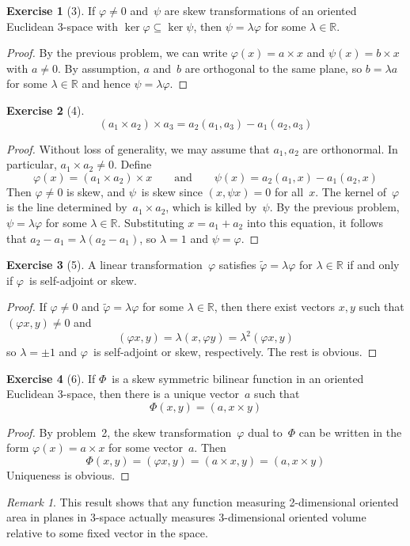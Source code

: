 \documentclass[letterpaper,12pt]{article}
\newcommand{\R}{\mathbb{R}}
\newcommand{\cross}{\times}
\newcommand{\iprod}[2]{(#1,#2)}
\newcommand{\adj}[1]{\widetilde{#1}}
\theoremstyle{definition}
\newtheorem*{exer}{Exercise}
\theoremstyle{remark}
\newtheorem*{rmk}{Remark}
\begin{document}
\begin{exer}[3]
If \(\varphi\ne 0\) and~\(\psi\) are skew transformations of an oriented Euclidean 3-space with \(\ker\varphi\subseteq\ker\psi\), then \(\psi=\lambda\varphi\) for some \(\lambda\in\R\).
\end{exer}
\begin{proof}
By the previous problem, we can write \(\varphi(x)=a\cross x\) and \(\psi(x)=b\cross x\) with \(a\ne 0\). By assumption, \(a\) and~\(b\) are orthogonal to the same plane, so \(b=\lambda a\) for some \(\lambda\in\R\) and hence \(\psi=\lambda\varphi\).
\end{proof}

\begin{exer}[4]
\[(a_1\cross a_2)\cross a_3=a_2(a_1,a_3)-a_1(a_2,a_3)\]
\end{exer}
\begin{proof}
Without loss of generality, we may assume that \(a_1,a_2\) are orthonormal. In particular, \(a_1\cross a_2\ne 0\). Define
\[\varphi(x)=(a_1\cross a_2)\cross x\qquad\text{and}\qquad\psi(x)=a_2(a_1,x)-a_1(a_2,x)\]
Then \(\varphi\ne 0\) is skew, and \(\psi\)~is skew since \(\iprod{x}{\psi x}=0\) for all~\(x\). The kernel of~\(\varphi\) is the line determined by~\(a_1\cross a_2\), which is killed by~\(\psi\). By the previous problem, \(\psi=\lambda\varphi\) for some \(\lambda\in\R\). Substituting \(x=a_1+a_2\) into this equation, it follows that \(a_2-a_1=\lambda(a_2-a_1)\), so \(\lambda=1\) and \(\psi=\varphi\).
\end{proof}

\begin{exer}[5]
A linear transformation~\(\varphi\) satisfies \(\adj{\varphi}=\lambda\varphi\) for \(\lambda\in\R\) if and only if \(\varphi\)~is self-adjoint or skew.
\end{exer}
\begin{proof}
If \(\varphi\ne 0\) and \(\adj{\varphi}=\lambda\varphi\) for some \(\lambda\in\R\), then there exist vectors \(x,y\) such that \(\iprod{\varphi x}{y}\ne 0\) and
\[\iprod{\varphi x}{y}=\lambda\iprod{x}{\varphi y}=\lambda^2\iprod{\varphi x}{y}\]
so \(\lambda=\pm 1\) and \(\varphi\)~is self-adjoint or skew, respectively. The rest is obvious.
\end{proof}

\begin{exer}[6]
If \(\Phi\)~is a skew symmetric bilinear function in an oriented Euclidean 3-space, then there is a unique vector~\(a\) such that
\[\Phi(x,y)=\iprod{a}{x\cross y}\]
\end{exer}
\begin{proof}
By problem~2, the skew transformation~\(\varphi\) dual to~\(\Phi\) can be written in the form \(\varphi(x)=a\cross x\) for some vector~\(a\). Then
\[\Phi(x,y)=\iprod{\varphi x}{y}=\iprod{a\cross x}{y}=\iprod{a}{x\cross y}\]
Uniqueness is obvious.
\end{proof}
\begin{rmk}
This result shows that any function measuring 2-dimensional oriented area in planes in 3-space actually measures 3-dimensional oriented volume relative to some fixed vector in the space.
\end{rmk}
\end{document}

